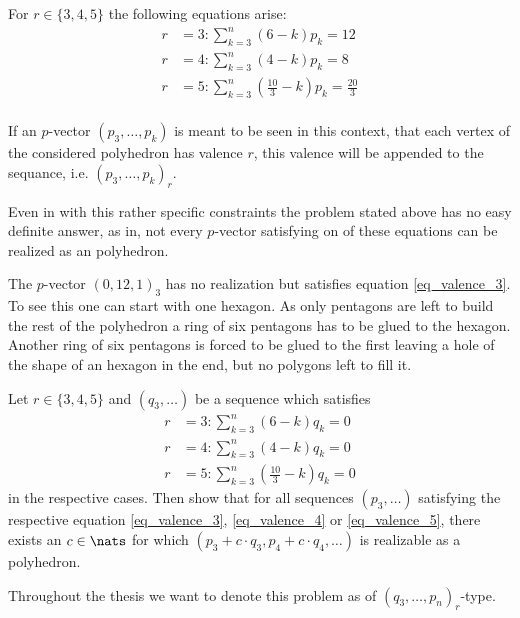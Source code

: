 For $r \in \{3, 4, 5\}$ the following equations arise:
\begin{align}
  r &= 3: \sum_{k=3}^n \left(6 - k \right) p_k = 12 \label{eq_valence_3}\\
  r &= 4: \sum_{k=3}^n \left(4 - k \right) p_k = 8  \label{eq_valence_4}\\
  r &= 5: \sum_{k=3}^n \left( \frac{10}{3} - k \right) p_k = \frac{20}{3} \label{eq_valence_5}\\
\end{align}
\begin{notation}
  If an $p$-vector $(p_3, \dots, p_k)$ is meant to be seen in this context, that each vertex of the considered polyhedron has valence $r$, this valence will be appended to the sequance, i.e. $(p_3, \dots, p_k)_r$.
\end{notation}
Even in with this rather specific constraints the problem stated above has no easy definite answer, as in, not every $p$-vector satisfying on of these equations can be realized as an polyhedron.
\begin{example}
  The $p$-vector $(0, 12, 1)_3$ has no realization but satisfies equation \ref{eq_valence_3}. To see this one can start with one hexagon. As only pentagons are left to build the rest of the polyhedron a ring of six pentagons has to be glued to the hexagon. Another ring of six pentagons is forced to be glued to the first leaving a hole of the shape of an hexagon in the end, but no polygons left to fill it.
\end{example}

\begin{problem}
  Let $r \in \{3, 4, 5\}$ and $(q_3, \dots)$ be a sequence which satisfies 
  \begin{align}
    r &= 3: \sum_{k=3}^n \left( 6            - k \right) q_k = 0 \label{eq_zero_curv_3}\\
    r &= 4: \sum_{k=3}^n \left( 4            - k \right) q_k = 0 \label{eq_zero_curv_4}\\
    r &= 5: \sum_{k=3}^n \left( \frac{10}{3} - k \right) q_k = 0 \label{eq_zero_curv_5}
  \end{align}
  in the respective cases. Then show that for all sequences $(p_3, \dots)$  satisfying the respective equation \ref{eq_valence_3}, \ref{eq_valence_4} or \ref{eq_valence_5}, there exists an $c \in \nats$ for which $(p_3 + c \cdot q_3, p_4 + c \cdot q_4, \dots)$ is realizable as a polyhedron.
\end{problem}
\begin{notation}
  Throughout the thesis we want to denote this problem as of $(q_3, \dots, p_n)_r$-type.
\end{notation}

